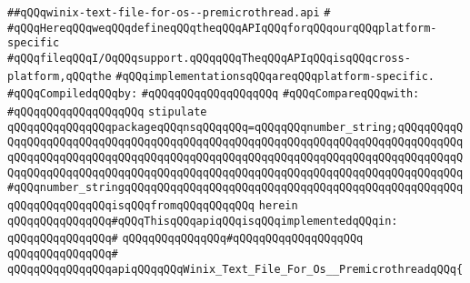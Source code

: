 \label{src/lib/std/src/io/winix-text-file-for-os--premicrothread.api}
\verb|##qQQqwinix-text-file-for-os--premicrothread.api|\newline
\verb|#|\newline
\verb|#qQQqHereqQQqweqQQqdefineqQQqtheqQQqAPIqQQqforqQQqourqQQqplatform-specific|\newline
\verb|#qQQqfileqQQqI/OqQQqsupport.qQQqqQQqTheqQQqAPIqQQqisqQQqcross-platform,qQQqthe|\newline
\verb|#qQQqimplementationsqQQqareqQQqplatform-specific.|\newline
\newline
\verb|#qQQqCompiledqQQqby:|\newline
\verb|#qQQqqQQqqQQqqQQqqQQq|\newline
\newline
\verb|#qQQqCompareqQQqwith:|\newline
\verb|#qQQqqQQqqQQqqQQqqQQq|\newline
\newline
\newline
\newline
\verb|stipulate|\newline
\verb|qQQqqQQqqQQqqQQqpackageqQQqnsqQQqqQQq=qQQqqQQqnumber_string;qQQqqQQqqQQqqQQqqQQqqQQqqQQqqQQqqQQqqQQqqQQqqQQqqQQqqQQqqQQqqQQqqQQqqQQqqQQqqQQqqQQqqQQqqQQqqQQqqQQqqQQqqQQqqQQqqQQqqQQqqQQqqQQqqQQqqQQqqQQqqQQqqQQqqQQqqQQqqQQqqQQqqQQqqQQqqQQqqQQqqQQqqQQqqQQqqQQqqQQqqQQqqQQqqQQqqQQqqQQq#qQQqnumber_stringqQQqqQQqqQQqqQQqqQQqqQQqqQQqqQQqqQQqqQQqqQQqqQQqqQQqqQQqqQQqqQQqqQQqisqQQqfromqQQqqQQqqQQq|\newline
\verb|herein|\newline
\newline
\verb|qQQqqQQqqQQqqQQq#qQQqThisqQQqapiqQQqisqQQqimplementedqQQqin:|\newline
\verb|qQQqqQQqqQQqqQQq#|\newline
\verb|qQQqqQQqqQQqqQQq#qQQqqQQqqQQqqQQqqQQq|\newline
\verb|qQQqqQQqqQQqqQQq#|\newline
\verb|qQQqqQQqqQQqqQQqapiqQQqqQQqWinix_Text_File_For_Os__PremicrothreadqQQq{|\newline
